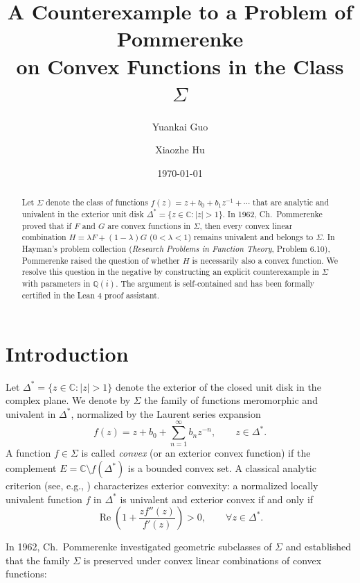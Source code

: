\documentclass[11pt,reqno]{amsart}
\title[A Counterexample to a Problem of Pommerenke on $\Sigma$]{A Counterexample to a Problem of Pommerenke\\on Convex Functions in the Class \texorpdfstring{$\Sigma$}{Sigma}}
\author{Yuankai Guo}
\author{Xiaozhe Hu}
\date{\today}
\theoremstyle{definition}
\renewcommand{\Re}{\operatorname{Re}}
\begin{document}
\begin{abstract}
Let $\Sigma$ denote the class of functions $f(z) = z + b_0 + b_1 z^{-1} + \cdots$ that are analytic and univalent in the exterior unit disk $\Delta^* = \{z \in \mathbb{C} : |z| > 1\}$. In 1962, Ch.~Pommerenke proved that if $F$ and $G$ are convex functions in $\Sigma$, then every convex linear combination $H = \lambda F + (1-\lambda)G$ ($0 < \lambda < 1$) remains univalent and belongs to $\Sigma$. In Hayman's problem collection (\emph{Research Problems in Function Theory}, Problem 6.10), Pommerenke raised the question of whether $H$ is necessarily also a convex function. We resolve this question in the negative by constructing an explicit counterexample in $\Sigma$ with parameters in $\mathbb{Q}(i)$. The argument is self-contained and has been formally certified in the \textsf{Lean 4} proof assistant.
\end{abstract}

\maketitle

\section{Introduction}

Let $\Delta^* = \{z \in \mathbb{C} : |z| > 1\}$ denote the exterior of the closed unit disk in the complex plane. We denote by $\Sigma$ the family of functions meromorphic and univalent in $\Delta^*$, normalized by the Laurent series expansion
\begin{equation}\label{eq:sigma-norm}
f(z) = z + b_0 + \sum_{n=1}^\infty b_n z^{-n}, \qquad z \in \Delta^*.
\end{equation}
A function $f \in \Sigma$ is called \emph{convex} (or an exterior convex function) if the complement $E = \mathbb{C} \setminus f(\Delta^*)$ is a bounded convex set. A classical analytic criterion (see, e.g., \cite{Duren1983,Pommerenke1962,Pommerenke1975}) characterizes exterior convexity: a normalized locally univalent function $f$ in $\Delta^*$ is univalent and exterior convex if and only if
\begin{equation}\label{eq:convex-criterion}
\Re\left(1 + \frac{z f''(z)}{f'(z)}\right) > 0, \qquad \forall z \in \Delta^*.
\end{equation}

In 1962, Ch.~Pommerenke \cite{Pommerenke1962} investigated geometric subclasses of $\Sigma$ and established that the family $\Sigma$ is preserved under convex linear combinations of convex functions:
\end{document}
